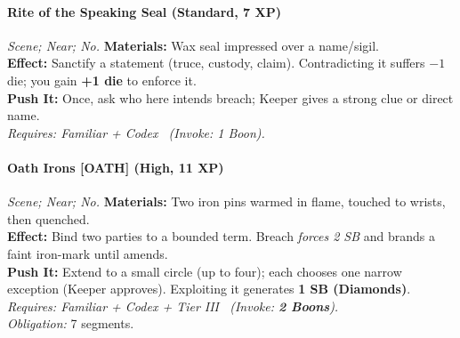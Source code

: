 \paragraph{Rite of the Speaking Seal (Standard, 7 XP)} \emph{Scene; Near; No.}
\textbf{Materials:} Wax seal impressed over a name/sigil.\\
\textbf{Effect:} Sanctify a statement (truce, custody, claim). Contradicting it suffers \(-1\) die; you gain \textbf{+1 die} to enforce it.\\
\textbf{Push It:} Once, ask who here intends breach; Keeper gives a strong clue or direct name.\\
\emph{Requires: Familiar + Codex \ (\textit{Invoke:} 1 Boon).}

\paragraph{Oath Irons \textnormal{[OATH]} (High, 11 XP)} \emph{Scene; Near; No.}
\textbf{Materials:} Two iron pins warmed in flame, touched to wrists, then quenched.\\
\textbf{Effect:} Bind two parties to a bounded term. Breach \emph{forces 2 SB} and brands a faint iron-mark until amends.\\
\textbf{Push It:} Extend to a small circle (up to four); each chooses one narrow exception (Keeper approves). Exploiting it generates \textbf{1 SB (Diamonds)}.\\
\emph{Requires: Familiar + Codex + Tier III \ (\textit{Invoke:} \textbf{2 Boons}).}\\
\emph{Obligation:} 7 segments.

